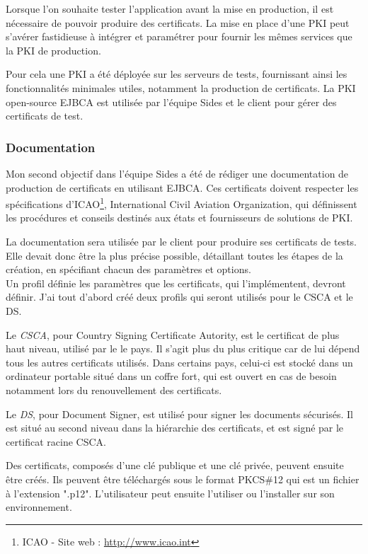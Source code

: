 Lorsque l'on souhaite tester l'application avant la mise en production, il est nécessaire de pouvoir produire des certificats.
La mise en place d'une PKI peut s'avérer fastidieuse à intégrer et paramétrer pour fournir les mêmes services que la PKI de production.

Pour cela une PKI a été déployée sur les serveurs de tests, fournissant ainsi les fonctionnalités minimales utiles, notamment la production de certificats.
La PKI open-source EJBCA est utilisée par l'équipe Sides et le client pour gérer des certificats de test.


\subsubsection{Documentation}

Mon second objectif dans l'équipe Sides a été de rédiger une documentation de production de certificats en utilisant EJBCA.
Ces certificats doivent respecter les spécifications d'ICAO\footnote{ICAO - Site web : \url{http://www.icao.int}}, International Civil Aviation Organization, qui définissent les procédures et conseils destinés aux états et fournisseurs de solutions de PKI.

La documentation sera utilisée par le client pour produire ses certificats de tests.
Elle devait donc être la plus précise possible, détaillant toutes les étapes de la création, en spécifiant chacun des paramètres et options.
\\

Un profil définie les paramètres que les certificats, qui l'implémentent, devront définir.
J'ai tout d'abord créé deux profils qui seront utilisés pour le CSCA et le DS.

Le \textit{CSCA}, pour Country Signing Certificate Autority, est le certificat de plus haut niveau, utilisé par le le pays.
Il s'agit plus du plus critique car de lui dépend tous les autres certificats utilisés.
Dans certains pays, celui-ci est stocké dans un ordinateur portable situé dans un coffre fort, qui est ouvert en cas de besoin notamment lors du renouvellement des certificats.

Le \textit{DS}, pour Document Signer, est utilisé pour signer les documents sécurisés.
Il est situé au second niveau dans la hiérarchie des certificats, et est signé par le certificat racine CSCA.

Des certificats, composés d'une clé publique et une clé privée, peuvent ensuite être créés.
Ils peuvent être téléchargés sous le format PKCS\#12 qui est un fichier à l'extension ".p12".
L'utilisateur peut ensuite l'utiliser ou l'installer sur son environnement.

